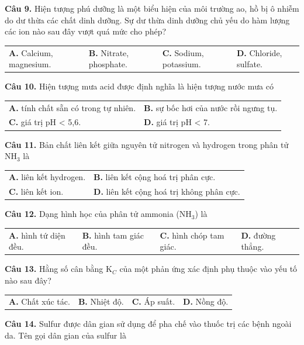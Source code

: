 \documentclass[11pt,a4paper]{article}
\begin{document}
\textbf{Câu 9.} Hiện tượng phú dưỡng là một biểu hiện của môi trường ao, hồ bị ô nhiễm do dư thừa các chất dinh dưỡng. Sự dư thừa dinh dưỡng chủ yếu do hàm lượng các ion nào sau đây vượt quá mức cho phép?

\begin{tabularx}{\textwidth}{@{}XXXX@{}}
\textbf{A.} Calcium, magnesium. & \textbf{B.} Nitrate, phosphate. & \textbf{C.} Sodium, potassium. & \textbf{D.} Chloride, sulfate. \\
\end{tabularx}

\textbf{Câu 10.} Hiện tượng mưa acid được định nghĩa là hiện tượng nước mưa có

\begin{tabularx}{\textwidth}{@{}XX@{}}
\textbf{A.} tính chất sẵn có trong tự nhiên. & \textbf{B.} sự bốc hơi của nước rồi ngưng tụ. \\
\textbf{C.} giá trị pH < 5,6. & \textbf{D.} giá trị pH < 7. \\
\end{tabularx}

\textbf{Câu 11.} Bản chất liên kết giữa nguyên tử nitrogen và hydrogen trong phân tử NH$_{3}$ là

\begin{tabularx}{\textwidth}{@{}XX@{}}
\textbf{A.} liên kết hydrogen. & \textbf{B.} liên kết cộng hoá trị phân cực. \\
\textbf{C.} liên kết ion. & \textbf{D.} liên kết cộng hoá trị không phân cực. \\
\end{tabularx}

\textbf{Câu 12.} Dạng hình học của phân tử ammonia (NH$_{3}$) là

\begin{tabularx}{\textwidth}{@{}XXXX@{}}
\textbf{A.} hình tứ diện đều. & \textbf{B.} hình tam giác đều. & \textbf{C.} hình chóp tam giác. & \textbf{D.} đường thẳng. \\
\end{tabularx}

\textbf{Câu 13.} Hằng số cân bằng K$_{C}$ của một phản ứng xác định phụ thuộc vào yếu tố nào sau đây?

\begin{tabularx}{\textwidth}{@{}XXXX@{}}
\textbf{A.} Chất xúc tác. & \textbf{B.} Nhiệt độ. & \textbf{C.} Áp suất. & \textbf{D.} Nồng độ. \\
\end{tabularx}

\textbf{Câu 14.} Sulfur được dân gian sử dụng để pha chế vào thuốc trị các bệnh ngoài da. Tên gọi dân gian của sulfur là
\end{document}
